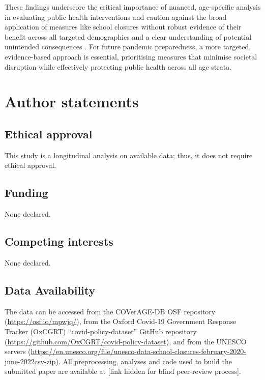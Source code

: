 \documentclass[]{interact}
\theoremstyle{plain}%
\theoremstyle{definition}
\theoremstyle{remark}
\begin{document}
These findings underscore the critical importance of nuanced, age-specific analysis in evaluating public health interventions and caution against the broad application of measures like school closures without robust evidence of their benefit across all targeted demographics and a clear understanding of potential unintended consequences \citep{alfano2020efficacy, molefi2021impact}. For future pandemic preparedness, a more targeted, evidence-based approach is essential, prioritising measures that minimise societal disruption while effectively protecting public health across all age strata.

\section{Author statements}\label{author-statements}

\subsection{Ethical approval}\label{ethical-approval}

This study is a longitudinal analysis on available data; thus, it does not require ethical approval.

\subsection{Funding}\label{funding}

None declared.

\subsection{Competing interests}\label{competing-interests}

None declared.

\subsection{Data Availability}\label{data-availability}

The data can be accessed from the COVerAGE-DB OSF repository (\url{https://osf.io/mpwjq/}), from the Oxford Covid-19 Government Response Tracker (OxCGRT) ``covid-policy-dataset'' GitHub repository (\url{https://github.com/OxCGRT/covid-policy-dataset}), and from the UNESCO servers (\url{https://en.unesco.org/file/unesco-data-school-closures-february-2020-june-2022csv-zip}). All preprocessing, analyses and code used to build the submitted paper are available at {[}link hidden for blind peer-review process{]}.



\end{document}
